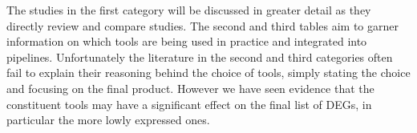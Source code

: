 The studies in the first category will be discussed in greater detail as they directly review and compare studies. The second and third tables aim to garner information on which tools are being used in practice and integrated into pipelines. Unfortunately the literature in the second and third categories often fail to explain their reasoning behind the choice of tools, simply stating the choice and focusing on the final product. However we have seen evidence \citep{lin2016comparison, everaert2017benchmarking, williams2017empirical, srivastava2020alignment} that the constituent tools may have a significant effect on the final list of \ac{DEG}s, in particular the more lowly expressed ones.


